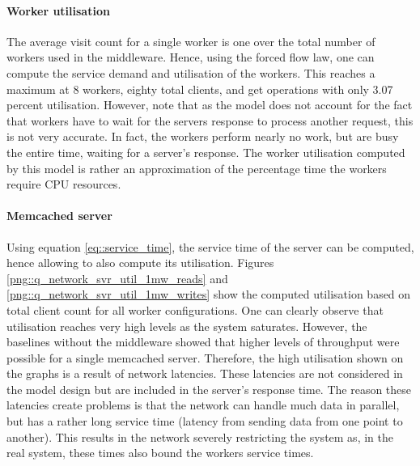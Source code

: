 \documentclass[11pt,a4paper]{article}
\begin{document}
\paragraph{Worker utilisation}
The average visit count for a single worker is one over the total number of workers used in the middleware. Hence, using the forced flow law, one can compute the service demand and utilisation of the workers. This reaches a maximum at 8 workers, eighty total clients, and get operations with only 3.07 percent utilisation. However, note that as the model does not account for the fact that workers have to wait for the servers response to process another request, this is not very accurate. In fact, the workers perform nearly no work, but are busy the entire time, waiting for a server's response. The worker utilisation computed by this model is rather an approximation of the percentage time the workers require CPU resources.

\paragraph{Memcached server}
Using equation \ref{eq::service_time}, the service time of the server can be computed, hence allowing to also compute its utilisation. Figures \ref{png::q_network_svr_util_1mw_reads} and \ref{png::q_network_svr_util_1mw_writes} show the computed utilisation based on total client count for all worker configurations. One can clearly observe that utilisation reaches very high levels as the system saturates. However, the baselines without the middleware showed that higher levels of throughput were possible for a single memcached server. Therefore, the high utilisation shown on the graphs is a result of network latencies. These latencies are not considered in the model design but are included in the server's response time. The reason these latencies create problems is that the network can handle much data in parallel, but has a rather long service time (latency from sending data from one point to another). This results in the network severely restricting the system as, in the real system, these times also bound the workers service times.
\end{document}
